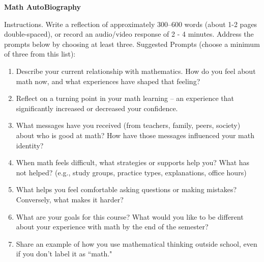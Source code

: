 \documentclass[10pt]{article}
\begin{document}
\begin{center}
    \Large \textbf{Math AutoBiography} \\
    \vspace{0.2cm}
\end{center}

Instructions. Write a reflection of approximately 300–600 words (about 1-2 pages double-spaced), or record an
audio/video response of 2 - 4 minutes. Address the prompts below by choosing at least three.
Suggested Prompts (choose a minimum of three from this list):
\begin{enumerate}
\item Describe your current relationship with mathematics. How do you feel about math now, and what experiences
have shaped that feeling?
\item Reflect on a turning point in your math learning – an experience that significantly increased or decreased your
confidence.
\item What messages have you received (from teachers, family, peers, society) about who is good at math? How have
those messages influenced your math identity?
\item When math feels difficult, what strategies or supports help you? What has not helped? (e.g., study groups,
practice types, explanations, office hours)
\item What helps you feel comfortable asking questions or making mistakes? Conversely, what makes it harder?
\item What are your goals for this course? What would you like to be different about your experience with math by the
end of the semester?
\item Share an example of how you use mathematical thinking outside school, even if you don’t label it as “math."
\end{enumerate}
\end{document}
